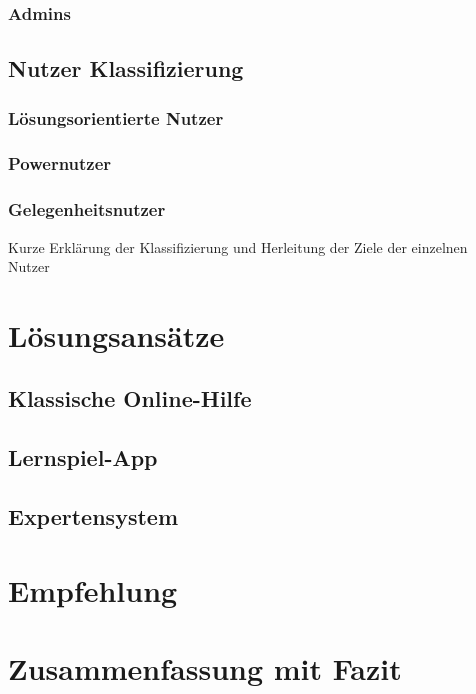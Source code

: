 \subsection{Admins}

\section{Nutzer Klassifizierung}

\subsection{Lösungsorientierte Nutzer}
\subsection{Powernutzer}
\subsection{Gelegenheitsnutzer}
Kurze Erklärung der Klassifizierung und Herleitung der Ziele der einzelnen Nutzer
\label{ch:Content1:sec:Section2}





\chapter{Lösungsansätze}

\section{Klassische Online-Hilfe}

\section{Lernspiel-App}

\section{Expertensystem}
\label{ch:Content2}



\chapter{Empfehlung}

\chapter{Zusammenfassung mit Fazit}
